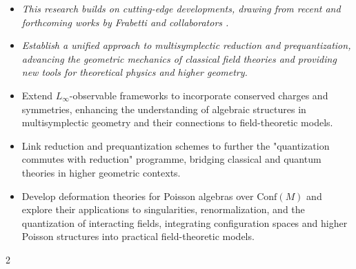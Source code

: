 \documentclass[a4paper]{article}
\begin{document}
\begin{itemize}[noitemsep,topsep=0pt,parsep=0pt,partopsep=0pt]	
	\item \it This research builds on cutting-edge developments, drawing from recent and forthcoming works by Frabetti and collaborators \cite{Frabetti2024,Frabetti2025}.
    \item \it Establish a unified approach to multisymplectic reduction and prequantization, advancing the geometric mechanics of classical field theories and providing new tools for theoretical physics and higher geometry.
    \item Extend $L_\infty$-observable frameworks to incorporate conserved charges and symmetries, enhancing the understanding of algebraic structures in multisymplectic geometry and their connections to field-theoretic models.
    \item Link reduction and prequantization schemes to further the "quantization commutes with reduction" programme, bridging classical and quantum theories in higher geometric contexts.
    \item Develop deformation theories for Poisson algebras over $\mathrm{Conf}(M)$ and explore their applications to singularities, renormalization, and the quantization of interacting fields, integrating configuration spaces and higher Poisson structures into practical field-theoretic models.
\end{itemize}




\begin{multicols}{2}
\footnotesize

\printbibliography

%
\end{multicols}


    
\end{document}
